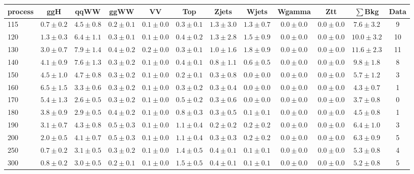 \begin{table}[!hb]
{\footnotesize
 \begin{center}
 \begin{tabular}{l c c c c c c c c c c c }
 \hline
 process & ggH & qqWW & ggWW & VV & Top & Zjets & Wjets & Wgamma & Ztt & $\sum$Bkg & Data \\
 \hline
115 & $0.7\pm0.2$ & $4.5\pm0.8$ & $0.2\pm0.1$ & $0.1\pm0.0$ & $0.3\pm0.1$ & $1.3\pm3.0$ & $1.3\pm0.7$ & $0.0\pm0.0$ & $0.0\pm0.0$ & $7.6\pm3.2$ & 9 \\
120 & $1.3\pm0.3$ & $6.4\pm1.1$ & $0.3\pm0.1$ & $0.1\pm0.0$ & $0.4\pm0.2$ & $1.3\pm2.8$ & $1.5\pm0.9$ & $0.0\pm0.0$ & $0.0\pm0.0$ & $10.0\pm3.2$ & 10 \\
130 & $3.0\pm0.7$ & $7.9\pm1.4$ & $0.4\pm0.2$ & $0.2\pm0.0$ & $0.3\pm0.1$ & $1.0\pm1.6$ & $1.8\pm0.9$ & $0.0\pm0.0$ & $0.0\pm0.0$ & $11.6\pm2.3$ & 11 \\
140 & $4.1\pm0.9$ & $7.6\pm1.3$ & $0.3\pm0.2$ & $0.1\pm0.0$ & $0.4\pm0.1$ & $0.8\pm1.1$ & $0.6\pm0.5$ & $0.0\pm0.0$ & $0.0\pm0.0$ & $9.8\pm1.8$ & 8 \\
150 & $4.5\pm1.0$ & $4.7\pm0.8$ & $0.3\pm0.2$ & $0.1\pm0.0$ & $0.2\pm0.1$ & $0.3\pm0.8$ & $0.0\pm0.0$ & $0.0\pm0.0$ & $0.0\pm0.0$ & $5.7\pm1.2$ & 3 \\
160 & $6.5\pm1.5$ & $3.3\pm0.6$ & $0.3\pm0.2$ & $0.1\pm0.0$ & $0.3\pm0.2$ & $0.3\pm0.4$ & $0.0\pm0.0$ & $0.0\pm0.0$ & $0.0\pm0.0$ & $4.3\pm0.7$ & 1 \\
170 & $5.4\pm1.3$ & $2.6\pm0.5$ & $0.3\pm0.2$ & $0.1\pm0.0$ & $0.5\pm0.2$ & $0.3\pm0.6$ & $0.0\pm0.0$ & $0.0\pm0.0$ & $0.0\pm0.0$ & $3.7\pm0.8$ & 0 \\
180 & $3.8\pm0.9$ & $2.9\pm0.5$ & $0.4\pm0.2$ & $0.1\pm0.0$ & $0.8\pm0.3$ & $0.3\pm0.5$ & $0.1\pm0.1$ & $0.0\pm0.0$ & $0.0\pm0.0$ & $4.5\pm0.8$ & 1 \\
190 & $3.1\pm0.7$ & $4.3\pm0.8$ & $0.5\pm0.3$ & $0.1\pm0.0$ & $1.1\pm0.4$ & $0.2\pm0.2$ & $0.2\pm0.2$ & $0.0\pm0.0$ & $0.0\pm0.0$ & $6.4\pm1.0$ & 3 \\
200 & $2.0\pm0.5$ & $4.1\pm0.7$ & $0.5\pm0.3$ & $0.1\pm0.0$ & $1.1\pm0.4$ & $0.3\pm0.3$ & $0.2\pm0.2$ & $0.0\pm0.0$ & $0.0\pm0.0$ & $6.3\pm0.9$ & 5 \\
250 & $0.7\pm0.2$ & $3.1\pm0.5$ & $0.3\pm0.2$ & $0.1\pm0.0$ & $1.4\pm0.5$ & $0.4\pm0.1$ & $0.1\pm0.1$ & $0.0\pm0.0$ & $0.0\pm0.0$ & $5.3\pm0.8$ & 4 \\
300 & $0.8\pm0.2$ & $3.0\pm0.5$ & $0.2\pm0.1$ & $0.1\pm0.0$ & $1.5\pm0.5$ & $0.4\pm0.1$ & $0.1\pm0.1$ & $0.0\pm0.0$ & $0.0\pm0.0$ & $5.2\pm0.8$ & 5 \\

\end{tabular}
\end{center}}
\end{table}
